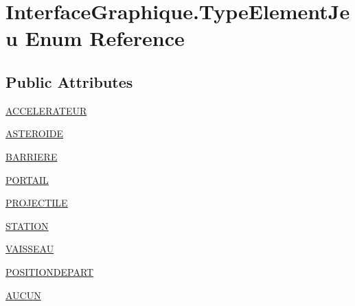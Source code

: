 \hypertarget{enum_interface_graphique_1_1_type_element_jeu}{\section{Interface\-Graphique.\-Type\-Element\-Jeu Enum Reference}
\label{enum_interface_graphique_1_1_type_element_jeu}
}
\subsection*{Public Attributes}
\begin{DoxyCompactItemize}
\item 
\hyperlink{enum_interface_graphique_1_1_type_element_jeu_ade1ba2cde4e5c43efd53d638202db4d9}{A\-C\-C\-E\-L\-E\-R\-A\-T\-E\-U\-R}
\item 
\hyperlink{enum_interface_graphique_1_1_type_element_jeu_aa17c2d1946fa2d2b120dd7c747272901}{A\-S\-T\-E\-R\-O\-I\-D\-E}
\item 
\hyperlink{enum_interface_graphique_1_1_type_element_jeu_af0c6f389018de0a1cbe36ea89f310fb5}{B\-A\-R\-R\-I\-E\-R\-E}
\item 
\hyperlink{enum_interface_graphique_1_1_type_element_jeu_abc27ef9d06672ae972b59088ea6c3cdb}{P\-O\-R\-T\-A\-I\-L}
\item 
\hyperlink{enum_interface_graphique_1_1_type_element_jeu_a9baebf838211e1b8f240a808fb49bdf8}{P\-R\-O\-J\-E\-C\-T\-I\-L\-E}
\item 
\hyperlink{enum_interface_graphique_1_1_type_element_jeu_a90e307eb0c1e971ae0c365d6b5592b5c}{S\-T\-A\-T\-I\-O\-N}
\item 
\hyperlink{enum_interface_graphique_1_1_type_element_jeu_aed5814929c9a9c1190099091bd0c88ec}{V\-A\-I\-S\-S\-E\-A\-U}
\item 
\hyperlink{enum_interface_graphique_1_1_type_element_jeu_a24cfad1fba320366e456baa5e96ad9ca}{P\-O\-S\-I\-T\-I\-O\-N\-D\-E\-P\-A\-R\-T}
\item 
\hyperlink{enum_interface_graphique_1_1_type_element_jeu_ab31eb3a5d91ab605a01683b52a9ae071}{A\-U\-C\-U\-N}
\end{DoxyCompactItemize}


